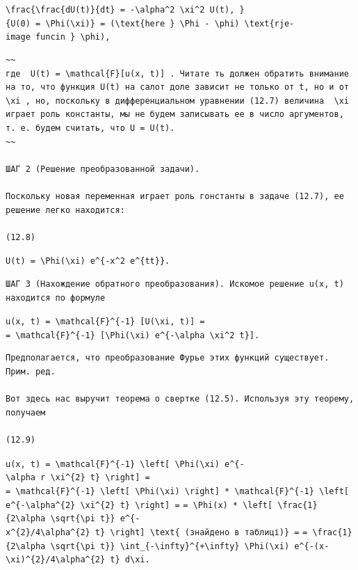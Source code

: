 \documentclass[
  ukrainian,
]{article}
\begin{document}
\texttt{\textbackslash{}frac\{\textbackslash{}frac\{dU(t)\}\{dt\}\ =\ -\textbackslash{}alpha\^{}2\ \textbackslash{}xi\^{}2\ U(t),\ \}\{U(0)\ =\ \textbackslash{}Phi(\textbackslash{}xi)\}\ =\ (\textbackslash{}text\{here\ \}\ \textbackslash{}Phi\ -\ \textbackslash{}phi)\ \textbackslash{}text\{rje-image\ funcin\ \}\ \textbackslash{}phi),}

\begin{verbatim}
~~
где  U(t) = \mathcal{F}[u(x, t)] . Читате ть должен обратить внимание на то, что функция U(t) на салот доле зависит не только от t, но и от  \xi , но, поскольку в дифференциальном уравнении (12.7) величина  \xi  играет роль константы, мы не будем записывать ее в число аргументов, т. е. будем считать, что U = U(t).
~~

ШАГ 2 (Решение преобразованной задачи).

Поскольку новая переменная играет роль гонстанты в задаче (12.7), ее решение легко находится:

(12.8)
\end{verbatim}

\texttt{U(t)\ =\ \textbackslash{}Phi(\textbackslash{}xi)\ e\^{}\{-x\^{}2\ e\^{}\{tt\}\}.}

\begin{verbatim}
ШАГ 3 (Нахождение обратного преобразования). Искомое решение u(x, t) находится по формуле
\end{verbatim}

\texttt{u(x,\ t)\ =\ \textbackslash{}mathcal\{F\}\^{}\{-1\}\ {[}U(\textbackslash{}xi,\ t){]}\ =}
\texttt{=\ \textbackslash{}mathcal\{F\}\^{}\{-1\}\ {[}\textbackslash{}Phi(\textbackslash{}xi)\ e\^{}\{-\textbackslash{}alpha\ \textbackslash{}xi\^{}2\ t\}{]}.}

\begin{verbatim}
Предполагается, что преобразование Фурье этих функций существует. Прим. ред.

Вот здесь нас выручит теорема о свертке (12.5). Используя эту теорему, получаем

(12.9)
\end{verbatim}

\texttt{u(x,\ t)\ =\ \textbackslash{}mathcal\{F\}\^{}\{-1\}\ \textbackslash{}left{[}\ \textbackslash{}Phi(\textbackslash{}xi)\ e\^{}\{-\textbackslash{}alpha\ r\ \textbackslash{}xi\^{}\{2\}\ t\}\ \textbackslash{}right{]}\ =}
\texttt{=\ \textbackslash{}mathcal\{F\}\^{}\{-1\}\ \textbackslash{}left{[}\ \textbackslash{}Phi(\textbackslash{}xi)\ \textbackslash{}right{]}\ *\ \textbackslash{}mathcal\{F\}\^{}\{-1\}\ \textbackslash{}left{[}\ e\^{}\{-\textbackslash{}alpha\^{}\{2\}\ \textbackslash{}xi\^{}\{2\}\ t\}\ \textbackslash{}right{]}\ =}
\texttt{=\ \textbackslash{}Phi(x)\ *\ \textbackslash{}left{[}\ \textbackslash{}frac\{1\}\{2\textbackslash{}alpha\ \textbackslash{}sqrt\{\textbackslash{}pi\ t\}\}\ e\^{}\{-x\^{}\{2\}/4\textbackslash{}alpha\^{}\{2\}\ t\}\ \textbackslash{}right{]}\ \textbackslash{}text\{\ (знайдено\ в\ таблиці)\}\ =}
\texttt{=\ \textbackslash{}frac\{1\}\{2\textbackslash{}alpha\ \textbackslash{}sqrt\{\textbackslash{}pi\ t\}\}\ \textbackslash{}int\_\{-\textbackslash{}infty\}\^{}\{+\textbackslash{}infty\}\ \textbackslash{}Phi(\textbackslash{}xi)\ e\^{}\{-(x-\textbackslash{}xi)\^{}\{2\}/4\textbackslash{}alpha\^{}\{2\}\ t\}\ d\textbackslash{}xi.}
\end{document}
